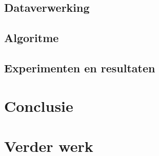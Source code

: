 \documentclass{article}
\begin{document}

\subsection{Dataverwerking}


\subsection{Algoritme}


\subsection{Experimenten en resultaten}


\section{Conclusie}


\section{Verder werk}






% 
% 
\end{document}
